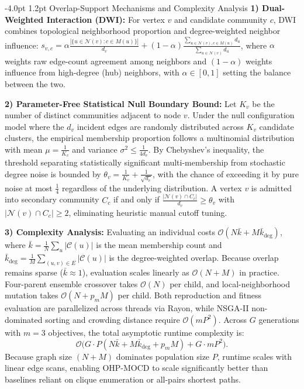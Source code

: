\documentclass{svproc}
\makeatletter
\renewcommand\subsection{\@startsection{subsection}{2}{\z@}%
  {-4.0pt \@plus -0.5pt \@minus -0.5pt}%
  {1.2pt \@plus 0.5pt}%
  {\normalfont\normalsize\bfseries\boldmath}}
\makeatother
\begin{document}
\enlargethispage{2\baselineskip}
\subsection{Overlap-Support Mechanisms and Complexity Analysis}\label{subsec:overlap_and_complexity}
\noindent\textbf{1) Dual-Weighted Interaction (DWI):} For vertex $v$ and candidate community $c$, DWI combines topological neighborhood proportion and degree-weighted neighbor influence: $s_{v,c} = \alpha \tfrac{|\{u \in \mathcal{N}(v) : c \in M(u)\}|}{d_v} + (1-\alpha) \tfrac{\sum_{u \in \mathcal{N}(v), c \in M(u)} d_u}{\sum_{u \in \mathcal{N}(v)} d_u}$, where $\alpha$ weights raw edge-count agreement among neighbors and $(1-\alpha)$ weights influence from high-degree (hub) neighbors, with $\alpha \in [0, 1]$ setting the balance between the two.

\noindent\textbf{2) Parameter-Free Statistical Null Boundary Bound:} Let $K_v$ be the number of distinct communities adjacent to node $v$. Under the null configuration model where the $d_v$ incident edges are randomly distributed across $K_v$ candidate clusters, the empirical membership proportion follows a multinomial distribution with mean $\mu = \frac{1}{K_v}$ and variance $\sigma^2 \le \frac{1}{4 d_v}$. By Chebyshev's inequality, the threshold separating statistically significant multi-membership from stochastic degree noise is bounded by $\theta_v = \frac{1}{K_v} + \frac{1}{\sqrt{d_v}}$, with the chance of exceeding it by pure noise at most $\frac{1}{4}$ regardless of the underlying distribution. A vertex $v$ is admitted into secondary community $C_c$ if and only if $\frac{|\mathcal{N}(v) \cap C_c|}{d_v} \ge \theta_v$ with $|\mathcal{N}(v) \cap C_c| \ge 2$, eliminating heuristic manual cutoff tuning.

\noindent\textbf{3) Complexity Analysis:} Evaluating an individual costs $\mathcal{O}(N\bar{k} + M\bar{k}_{\deg})$, where $\bar{k} = \frac{1}{N}\sum_u |\mathcal{C}(u)|$ is the mean membership count and $\bar{k}_{\deg} = \frac{1}{M}\sum_{(u,v)\in E} |\mathcal{C}(u)|$ is the degree-weighted overlap. Because overlap remains sparse ($\bar{k} \approx 1$), evaluation scales linearly as $\mathcal{O}(N + M)$ in practice. Four-parent ensemble crossover takes $\mathcal{O}(N)$ per child, and local-neighborhood mutation takes $\mathcal{O}(N + p_m M)$ per child. Both reproduction and fitness evaluation are parallelized across threads via Rayon, while NSGA-II non-dominated sorting and crowding distance require $\mathcal{O}(mP^2)$. Across $G$ generations with $m = 3$ objectives, the total asymptotic runtime complexity is:
\begin{equation}\label{eq:complexity}
\mathcal{O}\Big( G \cdot P(N\bar{k} + M\bar{k}_{\deg} + p_m M) + G \cdot m P^2 \Big).
\end{equation}
Because graph size $(N + M)$ dominates population size $P$, runtime scales with linear edge scans, enabling OHP-MOCD to scale significantly better than baselines reliant on clique enumeration or all-pairs shortest paths.
\end{document}
